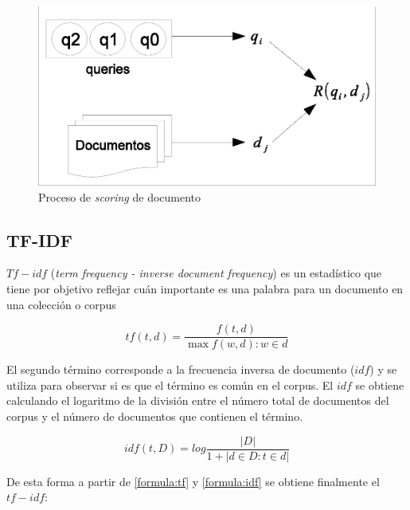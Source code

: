 \begin{figure}[!th]
\centering
\includegraphics[scale=.75]{images/ranking_process.eps}
\caption{Proceso de \textit{scoring} de documento}
\label{fig:ranking_process}
\end{figure}


\subsection{TF-IDF}
\label{marco:tfi-df}
$Tf-idf$ (\textit{term frequency - inverse document frequency}) es un estadístico que tiene por objetivo reflejar cuán importante es una palabra para un documento en una colección o corpus %

\begin{equation}
\label{formula:tf}
tf(t,d) = \dfrac{f(t,d) }{ \max{f(w,d) : w \in d}}
\end{equation}

El segundo término corresponde a la frecuencia inversa de documento ($idf$) y se utiliza para observar si es que el término es común en el corpus. El $idf$ se obtiene calculando el logaritmo de la división entre el número total de documentos del corpus y el número de documentos que contienen el término.

\begin{equation}
\label{formula:idf}
idf(t,D) = log \frac{ |D| }{1 + |{d \in D : t \in d}|}
\end{equation}

De esta forma a partir de \eqref{formula:tf} y \eqref{formula:idf} se obtiene finalmente el $tf-idf$: 

